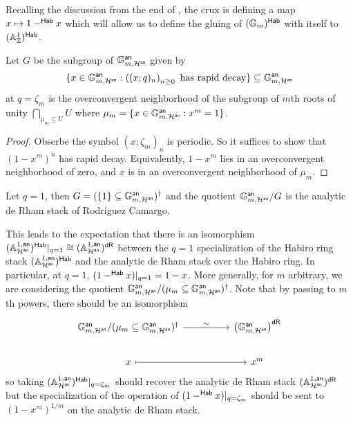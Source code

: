 Recalling the discussion from the end of , the crux is defining a map $x\mapsto 1-^{\mathsf{Hab}}x$ which will allow us to define the gluing of $(\mathbb{G}_{m})^{\mathsf{Hab}}$ with itself to $(\mathbb{A}^{1}_{\mathbb{Z}})^{\mathsf{Hab}}$. 
\begin{lemma}
    Let $G$ be the subgroup of $\mathbb{G}_{m,\mathcal{H}^{\mathsf{an}}}^{\mathsf{an}}$ given by 
    $$\{x\in\mathbb{G}_{m,\mathcal{H}^{\mathsf{an}}}^{\mathsf{an}}:\left((x;q)_{n}\right)_{n\geq0}\text{ has rapid decay}\}\subseteq\mathbb{G}_{m,\mathcal{H}^{\mathsf{an}}}^{\mathsf{an}}$$
    at $q=\zeta_{m}$ is the overconvergent neighborhood of the subgroup of $m$th roots of unity $\bigcap_{\mu_{m}\subseteq U}U$ where $\mu_{m}=\{x\in\mathbb{G}_{m,\mathcal{H}^{\mathsf{an}}}^{\mathsf{an}}:x^{m}=1\}$. 
\end{lemma}
\begin{proof}
    Obserbe the symbol $(x;\zeta_{m})_{n}$ is periodic. So it suffices to show that $(1-x^{m})^{n}$ has rapid decay. Equivalently, $1-x^{m}$ lies in an overconvergent neighborhood of zero, and $x$ is in an overconvergent neighborhood of $\mu_{m}$. 
\end{proof}
\begin{example}\label{ex: analytic dR stack}
    Let $q=1$, then $G=(\{1\}\subseteq\mathbb{G}_{m,\mathcal{H}^{\mathsf{an}}}^{\mathsf{an}})^{\dagger}$ and the quotient $\mathbb{G}_{m,\mathcal{H}^{\mathsf{an}}}^{\mathsf{an}}/G$ is the analytic de Rham stack of Rodr\'{i}guez Camargo.  
\end{example}
This leads to the expectation that there is an isomorphism $(\mathbb{A}^{1,\mathsf{an}}_{\mathcal{H}^{\mathsf{an}}})^{\mathsf{Hab}}|_{q=1}\cong (\mathbb{A}^{1,\mathsf{an}}_{\mathcal{H}^{\mathsf{an}}})^{\mathsf{dR}}$ between the $q=1$ specialization of the Habiro ring stack $(\mathbb{A}^{1,\mathsf{an}}_{\mathcal{H}^{\mathsf{an}}})^{\mathsf{Hab}}$ and the analytic de Rham stack over the Habiro ring. In particular, at $q=1$, $(1-^{\mathsf{Hab}}x)|_{q=1}=1-x$. More generally, for $m$ arbitrary, we are considering the quotient $\mathbb{G}_{m,\mathcal{H}^{\mathsf{an}}}^{\mathsf{an}}/(\mu_{m}\subseteq\mathbb{G}_{m,\mathcal{H}^{\mathsf{an}}}^{\mathsf{an}})^{\dagger}$. Note that by passing to $m$th powers, there should be an isomorphism 
$$%
\begin{tikzcd}
	{\GG_{m,\Hcal^{\an}}^{\an}/(\mu_{m}\subseteq\GG_{m,\Hcal^{\an}}^{\an})^{\dagger}} && {\left(\GG_{m,\Hcal^{\an}}^{\an}\right)^{\mathsf{dR}}} \\
	x && {x^{m}}
	\arrow["\sim", from=1-1, to=1-3]
	\arrow[maps to, from=2-1, to=2-3]
\end{tikzcd}$$
so taking $(\mathbb{A}^{1,\mathsf{an}}_{\mathcal{H}^{\mathsf{an}}})^{\mathsf{Hab}}|_{q=\zeta_{m}}$ should recover the analytic de Rham stack $(\mathbb{A}^{1,\mathsf{an}}_{\mathcal{H}^{\mathsf{an}}})^{\mathsf{dR}}$ but the specialization of the operation of $(1-^{\mathsf{Hab}}x)|_{q=\zeta_{m}}$ should be sent to $(1-x^{m})^{1/m}$ on the analytic de Rham stack. 

